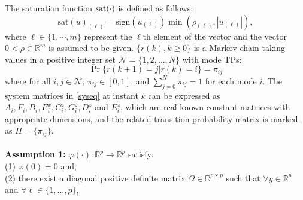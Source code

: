 \documentclass[conference]{IEEEtran}
\begin{document}
The saturation function $\rm{sat}(\cdot)$ is defined as follows:
\begin{equation}
\mathrm{sat}(u)_{(\ell)}=\mathrm{sign}(u_{(\ell)}) \min(\rho_{(\ell)},|u_{(\ell)}|),
\end{equation}
where $\ell \in \{1,\cdots,m\}$ represent the $\ell$th element of the vector and  the vector $0<\rho\in\mathbb{R}^{m}$ is assumed to be given. $\{r(k),k\geq0\}$ is a Markov chain taking values in a positive integer set $\mathcal{N}=\{1,2,\dots,N\}$ with mode TPs:
\begin{equation}
	\Pr\{r(k+1)=j|r(k)=i\}=\pi_{ij}
\end{equation}
where for all $i,j\in\mathcal{N}$, $\pi_{ij}\in[0,1]$, and $\sum_{j=0}^{N}\pi_{ij}=1$ for each mode $i$. The system matrices in \eqref{syseq} at instant $k$ can be expressed as $A_i,F_i,B_i,E^x_i,C^z_i,G^z_i,D^z_i$ and $E^z_i$, which are real known constant matrices with appropriate dimensions, and the related transition probability matrix is marked as $\mathit{\Pi}=\{\pi_{ij}\}$.\\
\\
\textbf{Assumption 1:} $\varphi(\cdot): \mathbb{R}^{p}\rightarrow\mathbb{R}^{p}$ satisfy:\\ 
(1) $\varphi(0)=0$ and,  \\
(2) there exist a diagonal positive definite matrix $\varOmega \in\mathbb{R}^{p\times p}$ such that $\forall y\in\mathbb{R}^{p}$ and $\forall \ell \in\{1,\dots,p\}$,
\end{document}
